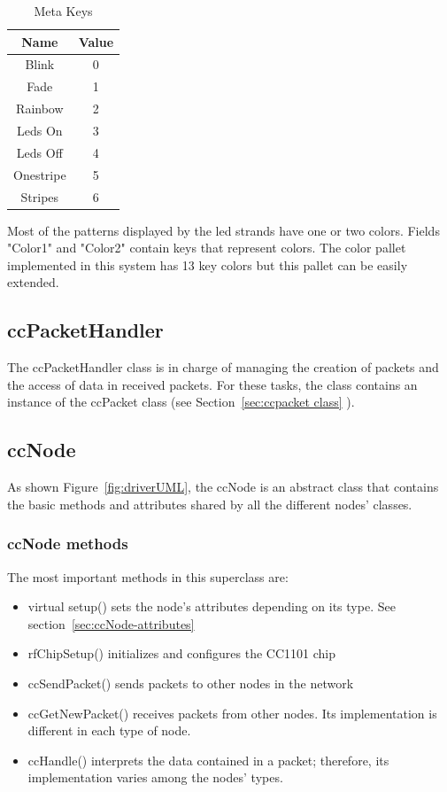 \begin{table}[h]
  \centering
  \begin{tabular}{ c | c }
    \hline
    \textbf{Name} & \textbf{Value}\\ [0.5ex]    
    \hline
    Blink & 0 \\
    Fade & 1 \\
    Rainbow & 2\\
    Leds On & 3\\
    Leds Off & 4\\ 
    Onestripe & 5\\
    Stripes & 6 \\
    \hline
  \end{tabular}
  \caption[Meta Keys]%
          {Meta Keys}
  \label{Meta Keys}
\end{table}

Most of the patterns displayed by the led strands have one or two colors. Fields "Color1" and "Color2" contain   keys that represent colors. The color pallet implemented in this system has 13 key colors but this pallet can be easily extended. 

\subsection{ccPacketHandler}
\label{sec:ccPacketHandler}
The ccPacketHandler class is in charge of managing the creation of packets and the access of data in received packets. For these tasks, the class contains an instance of the ccPacket class (see Section~\ref{sec:ccpacket class}	). 

\subsection{ccNode}
As shown Figure~\ref{fig:driverUML}, the ccNode is an abstract class that contains the basic methods and attributes shared by all the different nodes' classes. 
\subsubsection{ccNode methods}
The most important methods in this superclass are:
\begin{itemize}
\item virtual setup() sets the node's attributes depending on its type. See section~\ref{sec:ccNode-attributes} 
\item rfChipSetup() initializes and configures the CC1101 chip 
\item ccSendPacket() sends packets to other nodes in the network
\item ccGetNewPacket() receives packets from other nodes. Its implementation is different in each type of node.
\item ccHandle() interprets the data contained in a packet; therefore, its implementation varies among the nodes' types.
\end{itemize}

